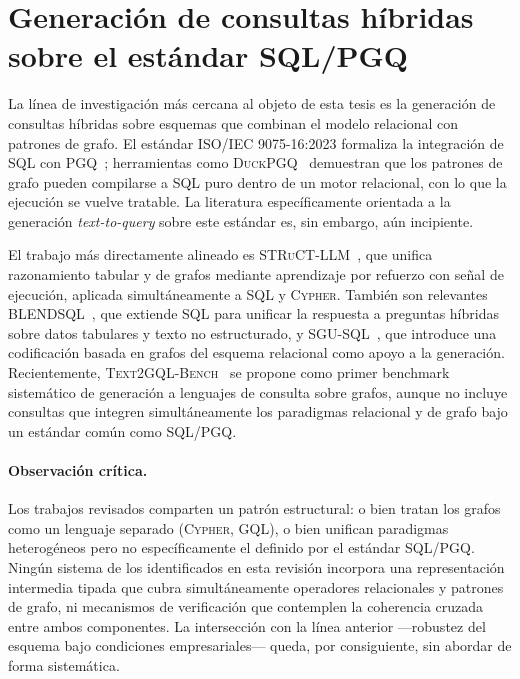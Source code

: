 \section{Generación de consultas híbridas sobre el estándar SQL/PGQ}
\label{sec:sota-hibridas}

La línea de investigación más cercana al objeto de esta tesis es la
generación de consultas híbridas sobre esquemas que combinan el modelo
relacional con patrones de grafo. El estándar ISO/IEC 9075-16:2023
formaliza la integración de \ac{SQL} con \ac{PGQ}~\cite{ISO9075_16_2023};
herramientas como \textsc{DuckPGQ}~\cite{DuckPGQ} demuestran que los
patrones de grafo pueden compilarse a \ac{SQL} puro dentro de un motor
relacional, con lo que la ejecución se vuelve tratable. La literatura
específicamente orientada a la generación \emph{text-to-query} sobre este
estándar es, sin embargo, aún incipiente.

El trabajo más directamente alineado es
\textsc{STRuCT-LLM}~\cite{STRuCT-LLM2026}, que unifica razonamiento
tabular y de grafos mediante aprendizaje por refuerzo con señal de
ejecución, aplicada simultáneamente a \ac{SQL} y \textsc{Cypher}. También
son relevantes \textsc{BLENDSQL}~\cite{BLENDSQL2025}, que extiende
\ac{SQL} para unificar la respuesta a preguntas híbridas sobre datos
tabulares y texto no estructurado, y
\textsc{SGU-SQL}~\cite{SGU-SQL2025}, que introduce una codificación
basada en grafos del esquema relacional como apoyo a la generación.
Recientemente, \textsc{Text2GQL-Bench}~\cite{text2gqlbench} se propone
como primer benchmark sistemático de generación a lenguajes de consulta
sobre grafos, aunque no incluye consultas que integren simultáneamente
los paradigmas relacional y de grafo bajo un estándar común como
\ac{SQL}/\ac{PGQ}.

\paragraph{Observación crítica.} Los trabajos revisados comparten un
patrón estructural: o bien tratan los grafos como un lenguaje separado
(\textsc{Cypher}, \textsc{GQL}), o bien unifican paradigmas heterogéneos
pero no específicamente el definido por el estándar \ac{SQL}/\ac{PGQ}.
Ningún sistema de los identificados en esta revisión incorpora una
representación intermedia tipada que cubra simultáneamente operadores
relacionales y patrones de grafo, ni mecanismos de verificación que
contemplen la coherencia cruzada entre ambos componentes. La intersección
con la línea anterior ---robustez del esquema bajo condiciones
empresariales--- queda, por consiguiente, sin abordar de forma
sistemática.


